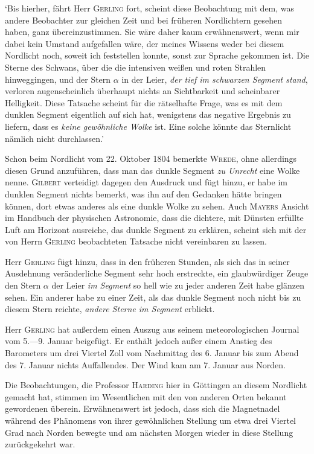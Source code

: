 ‘Bis hierher, fährt Herr \textsc{Gerling} fort, scheint diese Beobachtung mit dem, was andere Beobachter zur gleichen Zeit und bei früheren Nordlichtern gesehen haben, ganz übereinzustimmen. Sie wäre daher kaum erwähnenswert, wenn mir dabei kein Umstand aufgefallen wäre, der meines Wissens weder bei diesem Nordlicht noch, soweit ich feststellen konnte, sonst zur Sprache gekommen ist. Die Sterne des Schwans, über die die intensiven weißen und roten Strahlen hinweggingen, und der Stern $\alpha$ in der Leier, \textit{der tief im schwarzen Segment stand}, verloren augenscheinlich überhaupt nichts an Sichtbarkeit und scheinbarer Helligkeit. Diese Tatsache scheint für die rätselhafte Frage, was es mit dem dunklen Segment eigentlich auf sich hat, wenigstens das negative Ergebnis zu liefern, dass es \textit{keine gewöhnliche Wolke} ist. Eine solche könnte das Sternlicht nämlich nicht durchlassen.’

Schon beim Nordlicht vom 22. Oktober 1804 bemerkte \textsc{Wrede}, ohne allerdings diesen Grund anzuführen, dass man das dunkle Segment \textit{zu Unrecht} eine Wolke nenne. \textsc{Gilbert} verteidigt dagegen den Ausdruck und fügt hinzu, er habe im dunklen Segment nichts bemerkt, was ihn auf den Gedanken hätte bringen können, dort etwas anderes als eine dunkle Wolke zu sehen. Auch \textsc{Mayers} Ansicht im Handbuch der physischen Astronomie, dass die dichtere, mit Dünsten erfüllte Luft am Horizont ausreiche, das dunkle Segment zu erklären, scheint sich mit der von Herrn \textsc{Gerling} beobachteten Tatsache nicht vereinbaren zu lassen.

Herr \textsc{Gerling} fügt hinzu, dass in den früheren Stunden, als sich das in seiner Ausdehnung veränderliche Segment sehr hoch erstreckte, ein glaubwürdiger Zeuge den Stern $\alpha$ der Leier \textit{im Segment} so hell wie zu jeder anderen Zeit habe glänzen sehen. Ein anderer habe zu einer Zeit, als das dunkle Segment noch nicht bis zu diesem Stern reichte, \textit{andere Sterne im Segment} erblickt.

Herr \textsc{Gerling} hat außerdem einen Auszug aus seinem meteorologischen Journal vom 5.—9. Januar beigefügt. Er enthält jedoch außer einem Anstieg des Barometers um drei Viertel Zoll vom Nachmittag des 6. Januar bis zum Abend des 7. Januar nichts Auffallendes. Der Wind kam am 7. Januar aus Norden.

Die Beobachtungen, die Professor \textsc{Harding} hier in Göttingen an diesem Nordlicht gemacht hat, stimmen im Wesentlichen mit den von anderen Orten bekannt gewordenen überein. Erwähnenswert ist jedoch, dass sich die Magnetnadel während des Phänomens von ihrer gewöhnlichen Stellung um etwa drei Viertel Grad nach Norden bewegte und am nächsten Morgen wieder in diese Stellung zurückgekehrt war.

\bigskip

